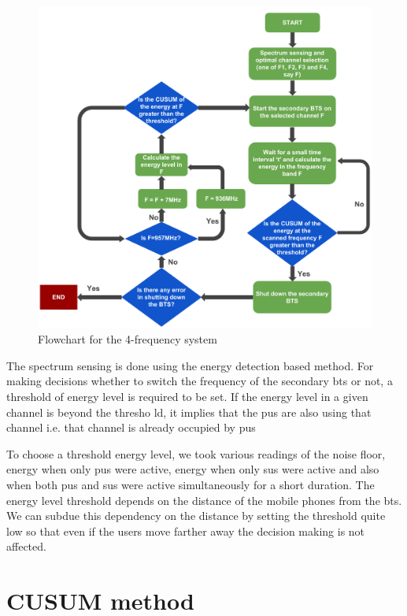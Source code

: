 \begin{figure}
\centering
\includegraphics[width=1\textwidth]{../images/freqSys4}
\caption[4-frequency system]{Flowchart for  the 4-frequency system}
\label{freqSys4}
\end{figure}

The spectrum sensing is done using the energy detection based method. For 
making decisions whether to switch the frequency of the secondary \gls{bts} or not, 
a threshold of energy level is required to be set. If the energy level in a 
given channel is beyond the thresho ld, it implies that the \glspl{pu} are
also using that channel i.e. that channel is already occupied by \glspl{pu}

To choose a threshold energy level, we took various readings of the noise 
floor, energy when only \glspl{pu} were active, energy when only \glspl{su}
were active and also when both \glspl{pu} and \glspl{su} were 
active simultaneously for a short duration. The energy level threshold depends
on the distance of the mobile phones from the \gls{bts}. We can subdue this 
dependency on the distance by setting the threshold quite low so that even if
the users move farther away the decision making is not affected.

\section{CUSUM method}

